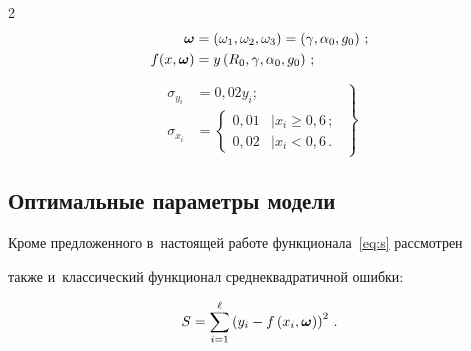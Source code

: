 \begin{multicols}{2}
\begin{align*}

  \bomega &= \left(\omega_1, \omega_2, \omega_3\right) = \left(\gamma, \alpha_0, g_0\right)\,;

\\

  f(x, \bomega) &= y\left(R_0, \gamma, \alpha_0, g_0\right)\,;

\end{align*}

\begin{equation}

\left.

  \begin{array}{rl}

    \sigma_{y_i} &= 0{,}02 y_i;\\

    \sigma_{x_i} &= \begin{cases}

        0{,}01 & \mid x_i \geq 0{,}6\,; \\

        0{,}02 & \mid x_i < 0{,}6\,.

        \end{cases}

      \end{array}

    \right\}

  \label{eq:sigmas_definition}

\end{equation}



\subsection{Оптимальные параметры модели}



Кроме предложенного в~настоящей работе функционала~\eqref{eq:s} рассмотрен

также и~классический функционал среднеквадратичной ошибки:

\begin{equation}

  S = \sum\limits_{i = 1}^\ell \left(y_i - f\left(x_i, \bomega\right)\right)^2\,.

  \label{eq:s_classic}

\end{equation}



 {\small \begin{center}  %


\end{center}}
\end{multicols}
